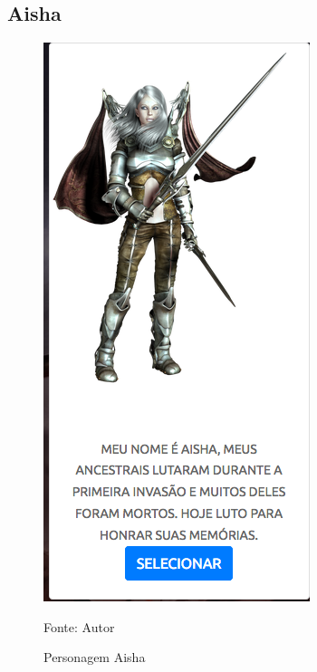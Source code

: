 \subsection{Aisha}
\begin{figure}[h]
	\centering
	\includegraphics[keepaspectratio=true,scale=0.5]{figuras/aisha.png}
	\caption{Personagem Aisha}
	Fonte: Autor
	\label{aisha}
\end{figure}

\clearpage

